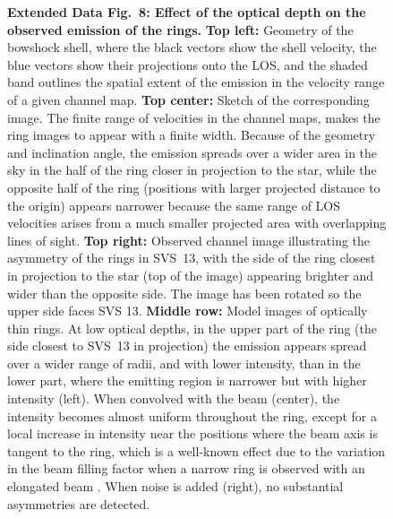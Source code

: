 \documentclass[12pt]{mythesis}
\begin{document}
\begin{figure}[p!]
{\bf Extended Data Fig.\ 8: Effect of the optical depth on the observed emission of the rings.} 
{\bf Top left:} Geometry of the bowshock shell, where the black vectors show the shell velocity, the blue vectors show their projections onto the LOS, and the shaded band outlines the spatial extent of the emission in the velocity range of a given channel map. 
{\bf Top center:} Sketch of the corresponding image. The finite range of velocities in the channel maps, makes the ring images to appear with a finite width. Because of the geometry and inclination angle, the emission spreads over a wider area in the sky in the half of the ring closer in projection to the star, while the opposite half of the ring (positions with larger projected distance to the origin) appears narrower because the same range of LOS velocities arises from a much smaller projected area with overlapping lines of sight.
{\bf Top right:} Observed channel image illustrating the asymmetry of the rings in SVS~13, with the side of the ring closest in projection to the star (top of the image) appearing brighter and wider than the opposite side. The image has been rotated so the upper side faces SVS 13.
{\bf Middle row:}
 Model images of optically thin rings. At low optical depths, in the upper part of the ring (the side closest to SVS~13 in projection) the emission appears spread over a wider range of radii, and with lower intensity, than in the lower part, where the emitting region is narrower but with higher intensity (left). When convolved with the beam (center), the intensity becomes almost uniform throughout the ring, except for a local increase in intensity near the positions where the beam axis is tangent to the ring, which is a well-known effect due to the variation in the beam filling factor when a narrow ring is observed with an elongated beam \cite{osorio2014}. When noise is added (right), no substantial asymmetries are detected.

\end{figure}
\end{document}

